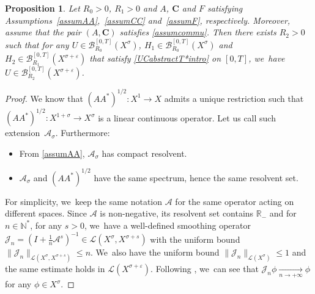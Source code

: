 \documentclass[10pt]{amsart}
\newtheorem{proposition}[theorem]{Proposition}
\theoremstyle{definition}
\let\mc\mathcal
\let\veps\varepsilon
\newcommand{\A}{\mc{A}}
\newcommand{\B}{\mc{B}}
\newcommand{\J}{\mc{J}}
\newcommand{\R}{\mathbb{R}}
\newcommand{\N}{\mathbb{N}}
\newcommand{\bC}{\boldsymbol{C}}
\providecommand{\norm}[1]{\lVert#1\rVert}
\begin{document}
\begin{proposition}\label{prop:abs-prop-reg}
Let $R_{0}>0$, $R_{1}>0$ and $A$, $\bC$ and $F$ satisfying Assumptions~\ref{assumAA},~\ref{assumCC} and~\ref{assumF}, respectively. Moreover, assume that the pair $(A, \bC)$ satisfies \cref{assumcommu}. Then there exists $R_{2}>0$ such that for any
$U\in \B_{R_{0}}^{[0,T]}(X^{\sigma})$, $H_{1}\in \B_{R_{0}}^{[0,T]}(X^{\sigma})$ and $H_{2}\in \B_{R_{1}}^{[0,T]}(X^{\sigma+\veps})$ that satisfy \eqref{UCabstractT*intro} on $[0,T]$, we~have $U\in \B_{R_{2}}^{[0,T]}(X^{\sigma+\veps})$.
\end{proposition}
\begin{proof}

We know that $(AA^*)^{1/2}: X^1\to X$ admits a unique restriction such that $(AA^*)^{1/2}: X^{1+\sigma}\to X^{\sigma}$ is a linear continuous operator. Let us call such extension~$\A_\sigma$. Furthermore:
\begin{itemize}
\item From \cref{assumAA}, $\A_\sigma$ has compact resolvent.
\item $\A_\sigma$ and $(AA^*)^{1/2}$ have the same spectrum, hence the same resolvent set.
\end{itemize}
For simplicity, we~keep the same notation $\A$ for the same operator acting on different spaces. Since $\A$ is non-negative, its resolvent set contains $\R_-$ and for $n\in \N^*$, for any $s>0$, we~have a well-defined smoothing operator $\mc{J}_n=(I+\frac{1}{n}\A^s)^{-1}\in \mc{L}(X^\sigma, X^{\sigma+s})$ with the uniform bound $\norm{\mc{J}_n}_{\mc{L}(X^\sigma, X^{\sigma+s})}\leq n$. We~also have the uniform bound $\norm{\mc{J}_n}_{\mc{L}(X^\sigma)}\leq 1$ and the same estimate holds in $\mc{L}(X^{\sigma+\veps})$. Following \cite[Prop.\,2.3.4]{TW:09}, we~can see that $\J_n \phi\underset{n\to+\infty}{\to} \phi$ for any $\phi\in X^\sigma$.


\end{proof}
\end{document}
